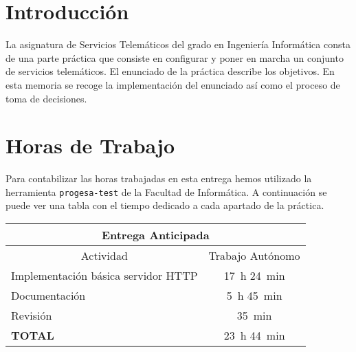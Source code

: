 \documentclass[12pt, onside]{article}
\newcommand{\key}{\texttt}
\newcommand{\HTTP}{HTTP}
\begin{document}

\newpage
\tableofcontents
\newpage

\section{Introducción}
La asignatura de Servicios Telemáticos del grado en Ingeniería Informática consta de una parte práctica que consiste en configurar y poner en marcha un conjunto de servicios telemáticos. El enunciado de la práctica %
describe los objetivos. En esta memoria se recoge la implementación del enunciado así como el proceso de toma de decisiones.





\section{Horas de Trabajo}
Para contabilizar las horas trabajadas en esta entrega hemos utilizado la herramienta \key{progesa-test} de la Facultad de Informática. A continuación se puede ver una tabla con el tiempo dedicado a cada apartado de la práctica.

\begin{center}
\begin{tabular}{|p{5cm}|c|}
    \hline
    \multicolumn{2}{|c|}{Entrega Anticipada} \\
    \hline\hline
    \multicolumn{1}{|c|}{Actividad} & Trabajo Autónomo \\
    \hline
    Implementación básica servidor {\HTTP} & \SI{17}{\hour} \SI{24}{\minute} \\
    \hline
    Documentación & \phantom{9}\SI{5}{\hour} \SI{45}{\minute} \\
    \hline
    Revisión & \phantom{\SI{99}{\hour}} \SI{35}{\minute} \\
    \hline
    \textbf{TOTAL} & \SI{23}{\hour} \SI{44}{\minute} \\ \hline
\end{tabular}
\end{center}


\end{document}

